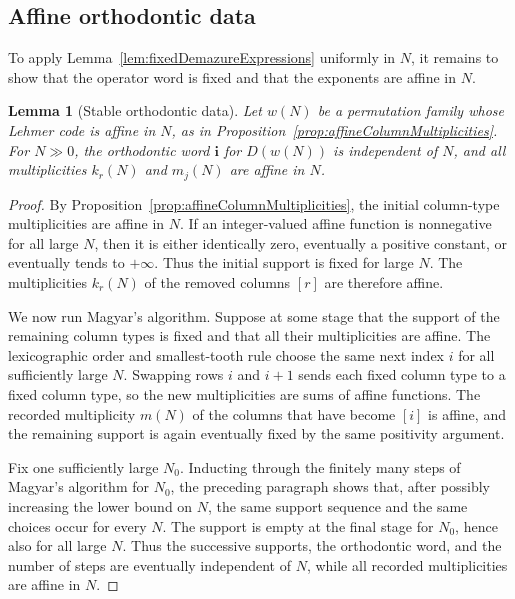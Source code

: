 \documentclass[11pt,reqno]{amsart}
\newtheorem{lemma}[theorem]{Lemma}
\theoremstyle{definition}
\begin{document}
\subsection{Affine orthodontic data}

To apply Lemma~\ref{lem:fixedDemazureExpressions} uniformly in \(N\), it
remains to show that the operator word is fixed and that the exponents are
affine in \(N\).

\begin{lemma}[Stable orthodontic data]
\label{lem:stableOrthodonticData}
Let \(w(N)\) be a permutation family whose Lehmer code is affine in \(N\),
as in Proposition~\ref{prop:affineColumnMultiplicities}.  For \(N\gg0\),
the orthodontic word \(\mathbf{i}\) for \(D(w(N))\) is independent of \(N\),
and all multiplicities \(k_r(N)\) and \(m_j(N)\) are affine in \(N\).
\end{lemma}

\begin{proof}
By Proposition~\ref{prop:affineColumnMultiplicities}, the initial
column-type multiplicities are affine in \(N\).  If an integer-valued affine
function is nonnegative for all large \(N\), then it is either identically
zero, eventually a positive constant, or eventually tends to \(+\infty\).
Thus the initial support is fixed for large \(N\).  The multiplicities
\(k_r(N)\) of the removed columns \([r]\) are therefore affine.

We now run Magyar's algorithm.  Suppose at some stage that the support of the
remaining column types is fixed and that all their multiplicities are affine.
The lexicographic order and smallest-tooth rule choose the same next index
\(i\) for all sufficiently large \(N\).  Swapping rows \(i\) and \(i+1\)
sends each fixed column type to a fixed column type, so the new
multiplicities are sums of affine functions.  The recorded multiplicity
\(m(N)\) of the columns that have become \([i]\) is affine, and the remaining
support is again eventually fixed by the same positivity argument.

Fix one sufficiently large \(N_0\).  Inducting through the finitely many steps
of Magyar's algorithm for \(N_0\), the preceding paragraph shows that, after
possibly increasing the lower bound on \(N\), the same support sequence and
the same choices occur for every \(N\).  The support is empty at the final
stage for \(N_0\), hence also for all large \(N\).
Thus the successive supports, the orthodontic word, and the number of steps
are eventually independent of \(N\), while all recorded multiplicities are
affine in \(N\).
\end{proof}
\end{document}
